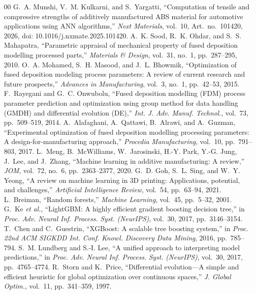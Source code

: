 \documentclass[conference,12pt]{IEEEtran}
\begin{document}
\begin{thebibliography}{00}
 G.~A. Munshi, V.~M. Kulkarni, and S.~Yargatti, ``Computation of tensile and compressive strengths of additively manufactured ABS material for automotive applications using ANN algorithms,'' \textit{Next Materials}, vol.~10, Art.~no.~101420, 2026, doi: 10.1016/j.nxmate.2025.101420.
 A.~K. Sood, R.~K. Ohdar, and S.~S. Mahapatra, ``Parametric appraisal of mechanical property of fused deposition modelling processed parts,'' \textit{Materials \& Design}, vol.~31, no.~1, pp.~287--295, 2010.
 O.~A. Mohamed, S.~H. Masood, and J.~L. Bhowmik, ``Optimization of fused deposition modeling process parameters: A review of current research and future prospects,'' \textit{Advances in Manufacturing}, vol.~3, no.~1, pp.~42--53, 2015.
 F.~Rayegani and G.~C. Onwubolu, ``Fused deposition modelling (FDM) process parameter prediction and optimization using group method for data handling (GMDH) and differential evolution (DE),'' \textit{Int. J. Adv. Manuf. Technol.}, vol.~73, pp.~509--519, 2014.
 A.~Alafaghani, A.~Qattawi, B.~Alrawi, and A.~Guzman, ``Experimental optimization of fused deposition modelling processing parameters: A design-for-manufacturing approach,'' \textit{Procedia Manufacturing}, vol.~10, pp.~791--803, 2017.
 L.~Meng, B.~McWilliams, W.~Jarosinski, H.-Y. Park, Y.-G. Jung, J.~Lee, and J.~Zhang, ``Machine learning in additive manufacturing: A review,'' \textit{JOM}, vol.~72, no.~6, pp.~2363--2377, 2020.
 G.~D. Goh, S.~L. Sing, and W.~Y. Yeong, ``A review on machine learning in 3D printing: Applications, potential, and challenges,'' \textit{Artificial Intelligence Review}, vol.~54, pp.~63--94, 2021.
 L.~Breiman, ``Random forests,'' \textit{Machine Learning}, vol.~45, pp.~5--32, 2001.
 G.~Ke \textit{et al.}, ``LightGBM: A highly efficient gradient boosting decision tree,'' in \textit{Proc. Adv. Neural Inf. Process. Syst. (NeurIPS)}, vol.~30, 2017, pp.~3146--3154.
 T.~Chen and C.~Guestrin, ``XGBoost: A scalable tree boosting system,'' in \textit{Proc. 22nd ACM SIGKDD Int. Conf. Knowl. Discovery Data Mining}, 2016, pp.~785--794.
 S.~M. Lundberg and S.-I. Lee, ``A unified approach to interpreting model predictions,'' in \textit{Proc. Adv. Neural Inf. Process. Syst. (NeurIPS)}, vol.~30, 2017, pp.~4765--4774.
 R.~Storn and K.~Price, ``Differential evolution---A simple and efficient heuristic for global optimization over continuous spaces,'' \textit{J. Global Optim.}, vol.~11, pp.~341--359, 1997.

\end{thebibliography}
\end{document}
